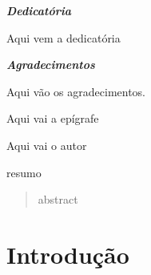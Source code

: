\documentclass[brazil,ruledheader]{abnt}
\begin{document}






\capa

\folhaderosto

\newpage
\begin{center}
{\huge \emph{\textbf{Dedicatória}}} \\
\end{center}

\vfill
\hspace{.45\textwidth} %
\begin{minipage}{.5\textwidth}
\begin{espacosimples}
Aqui vem a dedicatória
\end{espacosimples}
\end{minipage}
\vfill


\newpage
\begin{center}
{\huge \emph{\textbf{Agradecimentos}}} \\
\end{center}

Aqui vão os agradecimentos.

\newpage

\vspace*{\fill}

\epigraph{Aqui vai a epígrafe}{Aqui vai o autor}

\vspace*{\fill}

\tableofcontents

\listoffigures

\begin{resumo}
 resumo
\end{resumo}

\begin{abstract}
 abstract
\end{abstract}


\chapter{Introdução}
\end{document}
